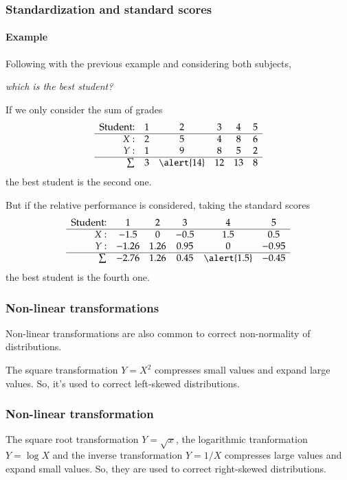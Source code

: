 \begin{frame}
\frametitle{Standardization and standard scores}
\framesubtitle{Example}
Following with the previous example and considering both subjects,
\begin{center}
\emph{which is the best student?}
\end{center}
If we only consider the sum of grades
\[
\begin{array}{rccccc}
\mbox{Student:} & 1 & 2 & 3 & 4 & 5\\ \hline
X: & 2 & 5 & 4 & 8 & 6 \\
Y: & 1 & 9 & 8 & 5 & 2 \\ \hline
\sum & 3 & \alert{14} & 12 & 13 & 8
\end{array}
\]
the best student is the second one. 

But if the relative performance is considered, taking the standard scores 
\[
\begin{array}{rccccc}
\mbox{Student:} & 1 & 2 & 3 & 4 & 5\\ \hline
X: & -1.5 & 0 & -0.5 & 1.5 & 0.5 \\
Y: & -1.26 & 1.26 & 0.95 & 0 & -0.95\\ \hline
\sum & -2.76 & 1.26 & 0.45 & \alert{1.5} & -0.45
\end{array}
\]
the best student is the fourth one. 
\end{frame}


\begin{frame}
\frametitle{Non-linear transformations}
Non-linear transformations are also common to correct non-normality of distributions.

The square transformation $Y=X^2$ compresses small values and expand large values.
So, it's used to correct left-skewed distributions.

\begin{center}
\scalebox{0.4}{}
\end{center} 
\end{frame}


\begin{frame}
\frametitle{Non-linear transformation}
The square root transformation $Y=\sqrt x$, the logarithmic tranformation $Y= \log X$ and the inverse transformation
$Y=1/X$ compresses large values and expand small values.
So, they are used to correct right-skewed distributions. 
\begin{center}
\scalebox{0.4}{}
\end{center} 
\end{frame}


